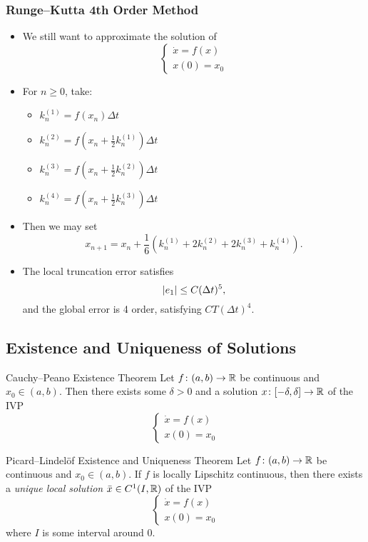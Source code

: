 \documentclass[class=article, crop=false]{standalone}
\begin{document}
  \subsubsection{Runge--Kutta 4th Order Method}
  \begin{itemize}
    \item We still want to approximate the solution of
    \[
      \begin{cases}
        \dot{x} = f(x) \\
        x(0) = x_0
      \end{cases}
    \]
    \item For $n\geq 0$, take:
    \begin{itemize}
      \item $k_n^{(1)} = f(x_n)\Delta t$
      \item $k_n^{(2)} = f(x_n + \frac{1}{2}k_n^{(1)})\Delta t$
      \item $k_n^{(3)} = f(x_n + \frac{1}{2}k_n^{(2)})\Delta t$
      \item $k_n^{(4)} = f(x_n + \frac{1}{2}k_n^{(3)})\Delta t$
    \end{itemize}
    \item Then we may set
    \[
      x_{n + 1} = x_n + \frac{1}{6}(k_n^{(1)} + 2k_n^{(2)} + 2k_n^{(3)} + k_n^{(4)}).
    \]
    \item The local truncation error satisfies
    \[
      \left\lvert e_1 \right\rvert\leq C(\Delta t)^5,
    \]
    and the global error is 4 order, satisfying $CT(\Delta t)^4$.
  \end{itemize}
  \subsection{Existence and Uniqueness of Solutions}
  \begin{theorem}{Cauchy--Peano Existence Theorem}
    Let $f\colon (a, b)\to \mathbb{R}$ be continuous and $x_0\in (a, b)$. Then there exists some $\delta > 0$ and a solution $x\colon [-\delta, \delta]\to \mathbb{R}$ of the IVP
    \[
      \begin{cases}
        \dot{x} = f(x) \\ 
        x(0) = x_0
      \end{cases}
    \]
  \end{theorem}
  \begin{theorem}{Picard--Lindel\"of Existence and Uniqueness Theorem}
    Let $f\colon (a, b)\to \mathbb{R}$ be continuous and $x_0\in (a, b)$. If $f$ is locally Lipschitz continuous, then there exists a \emph{unique local solution} $\bar{x}\in C^1(I, \mathbb{R})$ of the IVP
    \[
      \begin{cases}
        \dot{x} = f(x) \\ 
        x(0) = x_0
      \end{cases}
    \]
    where $I$ is some interval around $0$.
  \end{theorem}
\end{document}
